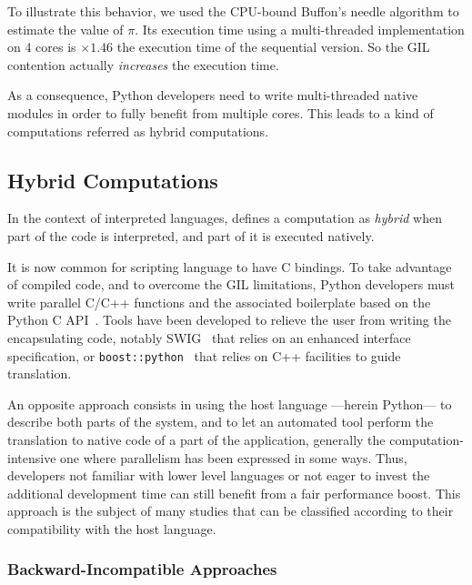 \documentclass{llncs}
\begin{document}
To illustrate this behavior, we used the CPU-bound Buffon's needle algorithm to
estimate the value of $\pi$. Its execution time using a multi-threaded
implementation on 4 cores is $\times 1.46$ the execution time of the sequential
version. So the GIL contention actually \emph{increases} the execution time.

As a consequence, Python developers need to write multi-threaded native
modules in order to fully benefit from multiple cores. This leads to a kind of
computations referred as hybrid computations.



\subsection{Hybrid Computations}

In the context of interpreted languages, \cite{dongara2007} defines a computation
as \emph{hybrid} when part of the code is interpreted, and part of it is
executed natively.

It is now common for scripting language to have C bindings. To take advantage of
compiled code, and to overcome the GIL limitations, Python developers must write
parallel C/C++ functions and the associated boilerplate based on the Python C
API~\cite{pythoncapi}. Tools have been developed to relieve the user from
writing the encapsulating code, notably SWIG~\cite{swig2003} that relies on an
enhanced interface specification, or
\texttt{boost::python}~\cite{boostpython2007} that relies on C++ facilities to
guide translation.

An opposite approach consists in using the host language ---herein Python--- to
describe both parts of the system, and to let an automated tool perform the
translation to native code of a part of the application, generally the
computation-intensive one where parallelism has been expressed in some ways.
Thus, developers not familiar with lower level languages or not eager to invest
the additional development time can still benefit from a fair performance boost.
This approach is the subject of many studies that can be classified according to
their compatibility with the host language.

\subsubsection{Backward-Incompatible Approaches}
\end{document}
